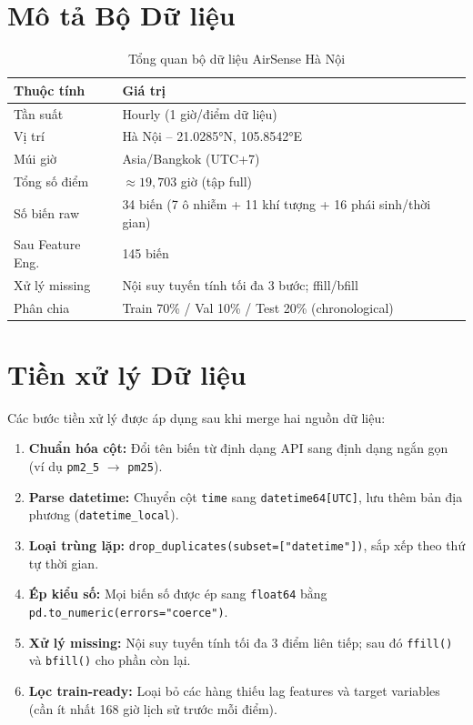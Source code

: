 \documentclass[12pt,a4paper]{report}
\begin{document}
\section{Mô tả Bộ Dữ liệu}

\begin{table}[H]
\centering
\caption{Tổng quan bộ dữ liệu AirSense Hà Nội}
\label{tab:dataset_overview}
\begin{tabularx}{\textwidth}{lX}
\toprule
\textbf{Thuộc tính} & \textbf{Giá trị} \\
\midrule
Tần suất          & Hourly (1 giờ/điểm dữ liệu) \\
Vị trí            & Hà Nội -- 21.0285°N, 105.8542°E \\
Múi giờ           & Asia/Bangkok (UTC+7) \\
Tổng số điểm      & $\approx 19{,}703$ giờ (tập full) \\
Số biến raw       & 34 biến (7 ô nhiễm + 11 khí tượng + 16 phái sinh/thời gian) \\
Sau Feature Eng.  & 145 biến \\
Xử lý missing     & Nội suy tuyến tính tối đa 3 bước; ffill/bfill \\
Phân chia         & Train 70\% / Val 10\% / Test 20\% (chronological) \\
\bottomrule
\end{tabularx}
\end{table}

\section{Tiền xử lý Dữ liệu}

Các bước tiền xử lý được áp dụng sau khi merge hai nguồn dữ liệu:

\begin{enumerate}
  \item \textbf{Chuẩn hóa cột:} Đổi tên biến từ định dạng API sang định dạng ngắn gọn (ví dụ \texttt{pm2\_5} $\to$ \texttt{pm25}).
  \item \textbf{Parse datetime:} Chuyển cột \texttt{time} sang \texttt{datetime64[UTC]}, lưu thêm bản địa phương (\texttt{datetime\_local}).
  \item \textbf{Loại trùng lặp:} \texttt{drop\_duplicates(subset=["datetime"])}, sắp xếp theo thứ tự thời gian.
  \item \textbf{Ép kiểu số:} Mọi biến số được ép sang \texttt{float64} bằng \texttt{pd.to\_numeric(errors="coerce")}.
  \item \textbf{Xử lý missing:} Nội suy tuyến tính tối đa 3 điểm liên tiếp; sau đó \texttt{ffill()} và \texttt{bfill()} cho phần còn lại.
  \item \textbf{Lọc train-ready:} Loại bỏ các hàng thiếu lag features và target variables (cần ít nhất 168 giờ lịch sử trước mỗi điểm).
\end{enumerate}
\end{document}
